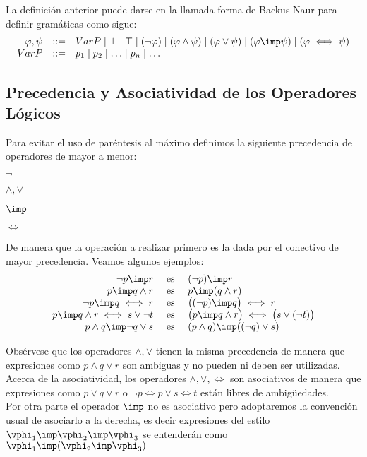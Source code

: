 \documentclass[11pt,letterpaper]{article}
\begin{document}
\espc


La definición anterior puede darse en la llamada forma de Backus-Naur para
definir gramáticas como sigue:
\[
 \begin{array}{rcl}
  \varphi,\psi & ::= & VarP \mid \bot \mid \top \mid 
(\neg\varphi) \mid (\varphi\land\psi) \mid (\varphi\lor\psi) \mid 
(\varphi\imp\psi) \mid (\varphi\iff\psi) \\
VarP & ::= & p_1 \mid p_2 \mid \ldots \mid p_n \mid \ldots
 \end{array}
\]

\subsection{Precedencia y Asociatividad de los Operadores Lógicos}

Para evitar el uso de paréntesis al máximo definimos la siguiente precedencia
de operadores de mayor a menor:
\bi
\item $\neg$
\item $\land,\lor$
\item $\imp$
\item $\iff$
\ei

De manera que la operación a realizar primero es la dada por el conectivo de
mayor precedencia. Veamos algunos ejemplos:
\[
\begin{array}{rll}
\neg p\imp r  & \text{ es } &  (\neg p)\imp r \\
p\imp q\land r& \text{ es } & p\imp (q\land r)\\ 
\neg p\imp q \iff r & \text{ es } & \big((\neg p)\imp q\big) \iff r\\
p\imp q \land r\iff s\lor \neg t & \text{ es } & 
\big(p\imp q \land r\big)\iff \big(s\lor (\neg t)\big)\\
p\land q \imp \neg q\lor s  & \text{ es } & (p\land q)\imp ((\neg q)\lor s) \\
\end{array}
\]


Obsérvese que los operadores $\land,\lor$ tienen la misma precedencia de
manera que expresiones como $p\land q\lor r$ son ambiguas y no pueden ni
deben ser utilizadas.\\

Acerca de la asociatividad, los operadores $\land,\lor,\iff$ son asociativos
de manera que expresiones como $p\lor q\lor r$ o $\neg p\iff p\lor s\iff t$
están libres de ambigüedades.\\
Por otra parte el operador $\imp$ no es asociativo pero adoptaremos la
convención usual de asociarlo a la derecha, es decir expresiones del estilo
$\vphi_1\imp\vphi_2\imp\vphi_3$ se entenderán como 
$\vphi_1\imp(\vphi_2\imp\vphi_3)$
\end{document}
